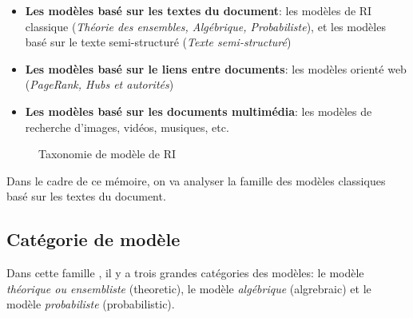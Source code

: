 \begin{itemize}
    \item \textbf{Les modèles basé sur les textes du document}: les modèles de RI classique (\textit{Théorie des ensembles, Algébrique, Probabiliste}), et les modèles basé sur le texte semi-structuré (\textit{Texte semi-structuré})
    \item \textbf{Les modèles basé sur le liens entre documents}: les modèles orienté web (\textit{PageRank, Hubs et autorités})
    \item \textbf{Les modèles basé sur les documents multimédia}: les modèles de recherche d'images, vidéos, musiques, etc.
\end{itemize}

\begin{figure}[htbp]
    \begin{center}
    \end{center}
    \caption{Taxonomie de modèle de RI \citep{soulier2014:def-evaluation-modele}}\label{fig:modele-ri}
\end{figure}

Dans le cadre de ce mémoire, on va analyser la famille des modèles classiques basé sur les textes du document.

\subsection{Catégorie de modèle}
Dans cette famille \citep*{modern-ir, approche-semantique, soulier2014:def-evaluation-modele}, il y a trois grandes catégories des modèles: le modèle \emph{théorique ou ensembliste} (theoretic), le modèle \emph{algébrique} (algrebraic) et le modèle \emph{probabiliste} (probabilistic).

